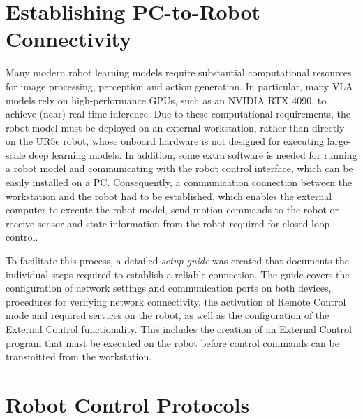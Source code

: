 \section{Establishing PC-to-Robot Connectivity}
Many modern robot learning models require substantial computational resources for image processing, perception and action generation. In particular, many \ac{VLA} models rely on high-performance GPUs, such as an NVIDIA RTX 4090, to achieve (near) real-time inference. 
Due to these computational requirements, the robot model must be deployed on an external workstation, rather than directly on the UR5e robot, whose onboard hardware is not designed for executing large-scale deep learning models. In addition, some extra software is needed for running a robot model and communicating with the robot control interface, which can be easily installed on a PC. Consequently, a communication connection between the workstation and the robot had to be established, which enables the external computer to execute the robot model, send motion commands to the robot or receive sensor and state information from the robot required for closed-loop control.

To facilitate this process, a detailed \textit{setup guide} was created that documents the individual steps required to establish a reliable connection.
The guide covers the configuration of network settings and communication ports on both devices, procedures for verifying network connectivity, the activation of Remote Control mode and required services on the robot, as well as the configuration of the External Control functionality. This includes the creation of an External Control program that must be executed on the robot before control commands can be transmitted from the workstation.






\section{Robot Control Protocols}


